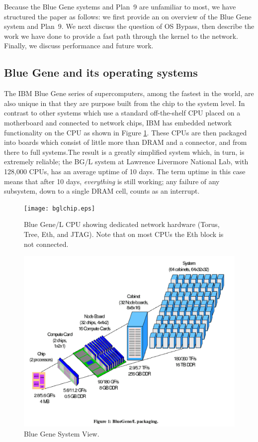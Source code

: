 \documentclass[a4,10pt,preprint]{sigplanconf}
\begin{document}
Because the Blue Gene systems and Plan~9 are unfamiliar to most, we have structured the paper as follows: we first provide an on overview of the Blue Gene system and Plan~9. We next discuss the question of OS Bypass, then describe the work we have done to provide a fast path through the kernel to the network. Finally, we discuss performance and future work. 

\subsection{Blue Gene and its operating systems}
The IBM Blue Gene\cite{DBLP:journals/ibmrd/GaraBCCCGHHHKLOSTV05} series of supercomputers, among the fastest in the world, are also unique in that they are purpose built from the chip to the system level. In contrast to other systems which use a standard off-the-shelf CPU placed on a motherboard and connected to network chips, IBM has embedded network functionality on the CPU as shown in Figure \ref{bglchip}. These CPUs are then packaged into boards which consist of little more than DRAM and a connector, and from there to full systems.The result is a greatly simplified system which, in turn, is extremely reliable; the BG/L system at Lawrence Livermore National Lab, with 128,000 CPUs, has an average uptime of 10 days. The term uptime in this case means that after 10 days, {\em everything} is still working; any failure of any subsystem, down to a single DRAM cell, counts as an interrupt.
\begin{figure}
\texttt{[image: bglchip.eps]} 
\caption{\label{bglchip}Blue Gene/L CPU showing dedicated network hardware (Torus, Tree, Eth, and JTAG). Note that on most CPUs the Eth block is not connected.}
\end{figure}
\begin{figure}
\includegraphics[width=.5\textwidth]{bluegenearch.pdf} 
\caption{\label{bglarch}Blue Gene System View.}
\end{figure}
\end{document}

